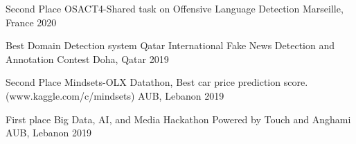 



\begin{cvhonors}


  \cvhonor
    {Second Place} %
    {OSACT4-Shared task on Offensive Language Detection} %
    {Marseille, France} %
    {2020} %
    
  \cvhonor
    {Best Domain Detection system } %
    {Qatar International Fake News Detection and Annotation Contest} %
    {Doha, Qatar} %
    {2019} %

\end{cvhonors}




\begin{cvhonors}

  \cvhonor
    {Second Place} %
    {Mindsets-OLX Datathon, Best car price prediction score.(www.kaggle.com/c/mindsets)} %
    {AUB, Lebanon} %
    {2019} %

  \cvhonor
    {First place} %
    {Big Data, AI, and Media Hackathon Powered by Touch and Anghami} %
    {AUB, Lebanon} %
    {2019} %


\end{cvhonors}
